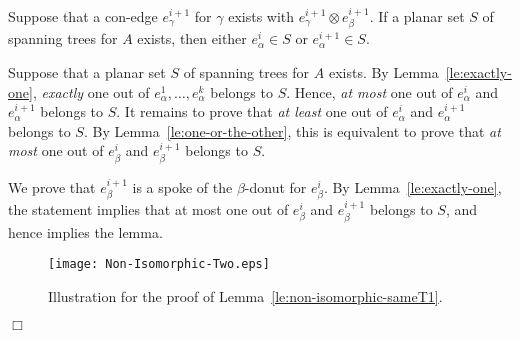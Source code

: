 \documentclass[letter,runningheads]{llncs}
\renewenvironment{proof}
{{\em Proof.\ }}{\hspace*{\fill}$\Box$\par\vspace{2mm}}
\newcommand{\conf}{\otimes}
\begin{document}
\begin{lemma}[{\sc Simplification 7}]\label{le:non-isomorphic-sameT1}
Suppose that a con-edge $e^{i+1}_\gamma$ for $\gamma$ exists with $e^{i+1}_{\gamma}\conf e^{i+1}_{\beta}$. If a planar set $S$ of spanning trees for $A$ exists, then either $e^i_\alpha\in S$ or $e^{i+1}_\alpha\in S$.
\end{lemma}

\begin{proof}
Suppose that a planar set $S$ of spanning trees for $A$ exists. By Lemma~\ref{le:exactly-one}, {\em exactly} one out of $e^1_\alpha,\dots,e^{k}_\alpha$ belongs to $S$. Hence, {\em at most} one out of $e^i_\alpha$ and $e^{i+1}_\alpha$ belongs to $S$. It remains to prove that {\em at least} one out of $e^i_\alpha$ and $e^{i+1}_\alpha$ belongs to $S$. By Lemma~\ref{le:one-or-the-other}, this is equivalent to prove that {\em at most} one out of $e^i_\beta$ and $e^{i+1}_\beta$ belongs to $S$.

We prove that $e^{i+1}_\beta$ is a spoke of the $\beta$-donut for $e^i_\beta$. By Lemma~\ref{le:exactly-one}, the statement implies that at most one out of $e^i_\beta$ and $e^{i+1}_\beta$ belongs to $S$, and hence implies the lemma.

\begin{figure}[tb]
\begin{center}
\mbox{\texttt{[image: Non-Isomorphic-Two.eps]}}
\caption{Illustration for the proof of Lemma~\ref{le:non-isomorphic-sameT1}.}
\label{fig:non-isomorphic-two}
\end{center}
\end{figure}


\end{proof}
\end{document}
